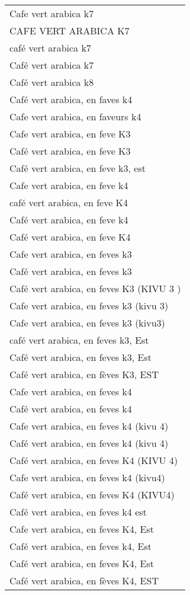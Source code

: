 \documentclass[
]{book}
\begin{document}
\begin{longtable}[t]{l}
\addlinespace
Cafe vert arabica k7\\
CAFE VERT ARABICA K7\\
café vert arabica k7\\
Café vert arabica k7\\
Café vert arabica k8\\
\addlinespace
Café vert arabica, en faves k4\\
Cafe vert arabica, en faveurs k4\\
Cafe vert arabica, en feve K3\\
Café vert arabica, en feve K3\\
Café vert arabica, en feve k3, est\\
\addlinespace
Cafe vert arabica, en feve k4\\
café vert arabica, en feve K4\\
Café vert arabica, en feve k4\\
Café vert arabica, en feve K4\\
Cafe vert arabica, en feves k3\\
\addlinespace
Café vert arabica, en feves k3\\
Café vert arabica, en feves K3 (KIVU 3 )\\
Cafe vert arabica, en feves k3 (kivu 3)\\
Cafe vert arabica, en feves k3 (kivu3)\\
café vert arabica, en feves k3, Est\\
\addlinespace
Café vert arabica, en feves k3, Est\\
Café vert arabica, en fèves K3, EST\\
Cafe vert arabica, en feves k4\\
Café vert arabica, en feves k4\\
Cafe vert arabica, en feves k4 (kivu 4)\\
\addlinespace
Café vert arabica, en feves k4 (kivu 4)\\
Café vert arabica, en feves K4 (KIVU 4)\\
Cafe vert arabica, en feves k4 (kivu4)\\
Café vert arabica, en feves K4 (KIVU4)\\
Café vert arabica, en feves k4 est\\
\addlinespace
Cafe vert arabica, en feves K4, Est\\
Café vert arabica, en feves k4, Est\\
Café vert arabica, en feves K4, Est\\
Café vert arabica, en fèves K4, EST\\

\end{longtable}
\end{document}
